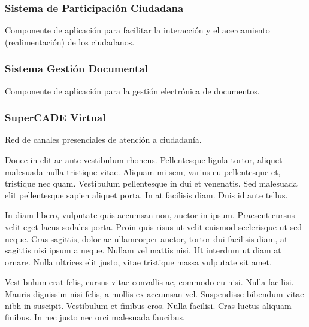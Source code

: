 \documentclass[
	a4paper, %
	12pt, %
]{include/CSSullivanBusinessReport}
\begin{document}
\subsubsection{Sistema de Participación
Ciudadana}\label{sec:sistema-de-participaciuxf3n-ciudadana}

Componente de aplicación para facilitar la interacción y el acercamiento
(realimentación) de los ciudadanos.

\subsubsection{Sistema Gestión
Documental}\label{sec:sistema-gestiuxf3n-documental}

Componente de aplicación para la gestión electrónica de documentos.

\subsubsection{SuperCADE Virtual}\label{sec:supercade-virtual}

Red de canales presenciales de atención a
ciudadanía.

Donec in elit ac ante vestibulum rhoncus. Pellentesque ligula tortor, aliquet malesuada nulla tristique vitae. Aliquam mi sem, varius eu pellentesque et, tristique nec quam. Vestibulum pellentesque in dui et venenatis. Sed malesuada elit pellentesque sapien aliquet porta. In at facilisis diam. Duis id ante tellus. %

In diam libero, vulputate quis accumsan non, auctor in ipsum. Praesent cursus velit eget lacus sodales porta. Proin quis risus ut velit euismod scelerisque ut sed neque. Cras sagittis, dolor ac ullamcorper auctor, tortor dui facilisis diam, at sagittis nisi ipsum a neque. Nullam vel mattis nisi. Ut interdum ut diam at ornare. Nulla ultrices elit justo, vitae tristique massa vulputate sit amet.

\nonumsidenote{
	}Vestibulum erat felis, cursus vitae convallis ac, commodo eu nisi. Nulla facilisi. Mauris dignissim nisi felis, a mollis ex accumsan vel. Suspendisse bibendum vitae nibh in suscipit. Vestibulum et finibus eros. Nulla facilisi. Cras luctus aliquam finibus. In nec justo nec orci malesuada faucibus.
\end{document}

